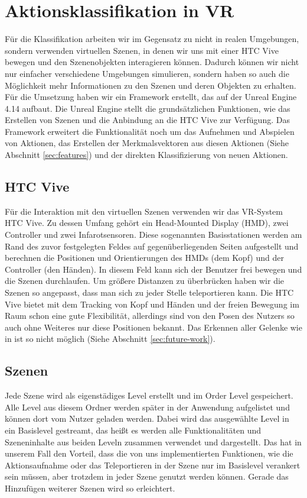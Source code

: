 
\section{Aktionsklassifikation in VR}

Für die Klassifikation arbeiten wir im Gegensatz zu \cite{scene-grok} nicht in realen Umgebungen, sondern verwenden virtuellen Szenen, in denen wir uns mit einer HTC Vive \cite{htc-vive} bewegen und den Szenenobjekten interagieren können. Dadurch können wir nicht nur einfacher verschiedene Umgebungen simulieren, sondern haben so auch die Möglichkeit mehr Informationen zu den Szenen und deren Objekten zu erhalten.
Für die Umsetzung haben wir ein Framework erstellt, das auf der Unreal Engine 4.14 \cite{ue4} aufbaut. Die Unreal Engine stellt die grundsätzlichen Funktionen, wie das Erstellen von Szenen und die Anbindung an die HTC Vive zur Verfügung. Das Framework erweitert die Funktionalität noch um das Aufnehmen und Abspielen von Aktionen, das Erstellen der Merkmalsvektoren aus diesen Aktionen (Siehe Abschnitt \ref{sec:features}) und der direkten Klassifizierung von neuen Aktionen.

\subsection{HTC Vive}
Für die Interaktion mit den virtuellen Szenen verwenden wir das VR-System HTC Vive. Zu dessen Umfang gehört ein Head-Mounted Display (HMD), zwei Controller und zwei Infarotsensoren. Diese sogenannten Basisstationen werden am Rand des zuvor festgelegten Feldes auf gegenüberliegenden Seiten aufgestellt und berechnen die Positionen und Orientierungen des HMDs (dem Kopf) und der Controller (den Händen). In diesem Feld kann sich der Benutzer frei bewegen und die Szenen durchlaufen. Um größere Distanzen zu überbrücken haben wir die Szenen so angepasst, dass man sich zu jeder Stelle teleportieren kann. Die HTC Vive bietet mit dem Tracking von Kopf und Händen und der freien Bewegung im Raum schon eine gute Flexibilität, allerdings sind von den Posen des Nutzers so auch ohne Weiteres nur diese Positionen bekannt. Das Erkennen aller Gelenke wie in \cite{scene-grok} ist so nicht möglich (Siehe Abschnitt \ref{sec:future-work}).

\subsection{Szenen}
Jede Szene wird als eigenstädiges Level erstellt und im Order \glqq{}Level\grqq{} gespeichert. Alle Level aus diesem Ordner werden später in der Anwendung aufgelistet und können dort vom Nutzer geladen werden. Dabei wird das ausgewählte Level in ein Basislevel \glqq{}gestreamt\grqq{}, das heißt es werden alle Funktionalitäten und Szeneninhalte aus beiden Leveln zusammen verwendet und dargestellt. Das hat in unserem Fall den Vorteil, dass die von uns implementierten Funktionen, wie die Aktionsaufnahme oder das Teleportieren in der Szene nur im Basislevel verankert sein müssen, aber trotzdem in jeder Szene genutzt werden können. Gerade das Hinzufügen weiterer Szenen wird so erleichtert.


